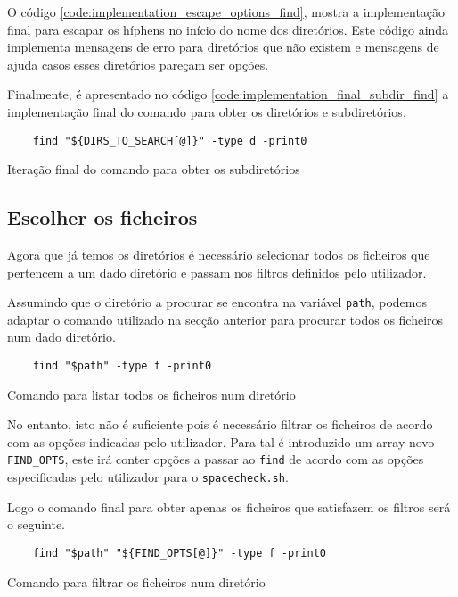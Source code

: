 O código \ref{code:implementation_escape_options_find}, mostra a implementação
final para escapar os híphens no início do nome dos diretórios. Este código
ainda implementa mensagens de erro para diretórios que não existem e mensagens
de ajuda casos esses diretórios pareçam ser opções.

Finalmente, é apresentado no código \ref{code:implementation_final_subdir_find}
a implementação final do comando para obter os diretórios e subdiretórios.

\begin{listing}[H]
	\centering
	\begin{verbatim}
    find "${DIRS_TO_SEARCH[@]}" -type d -print0
  \end{verbatim}
	\caption{Iteração final do comando para obter os subdiretórios}
	\label{code:implementation_final_subdir_find}
\end{listing}

\subsection{Escolher os ficheiros}

Agora que já temos os diretórios é necessário selecionar todos os ficheiros que
pertencem a um dado diretório e passam nos filtros definidos pelo utilizador.

Assumindo que o diretório a procurar se encontra na variável \Verb|path|, podemos
adaptar o comando utilizado na secção anterior para procurar todos os ficheiros
num dado diretório.

\begin{listing}[H]
	\centering
	\begin{verbatim}
    find "$path" -type f -print0
  \end{verbatim}
	\caption{Comando para listar todos os ficheiros num diretório}
\end{listing}

No entanto, isto não é suficiente pois é necessário filtrar os ficheiros de
acordo com as opções indicadas pelo utilizador. Para tal é introduzido um array
novo \Verb|FIND_OPTS|, este irá conter opções a passar ao \Verb|find| de acordo
com as opções especificadas pelo utilizador para o \Verb|spacecheck.sh|.

Logo o comando final para obter apenas os ficheiros que satisfazem os filtros
será o seguinte.

\begin{listing}[H]
	\centering
	\begin{verbatim}
    find "$path" "${FIND_OPTS[@]}" -type f -print0
  \end{verbatim}
	\caption{Comando para filtrar os ficheiros num diretório}
\end{listing}

